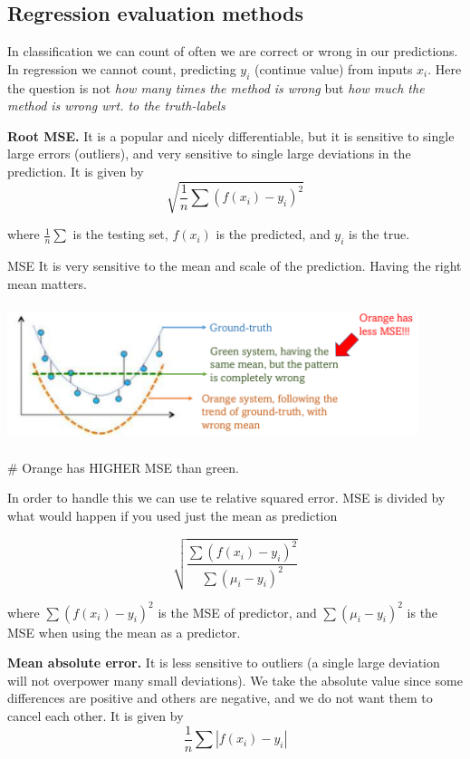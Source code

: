 \documentclass{article}
\begin{document}
\bigskip
\subsection*{Regression evaluation methods}

In classification we can count of often we are correct or wrong in our predictions. In regression we cannot count, predicting \(y_i\) (continue value) from inputs \(x_i\). Here the question is not \emph{how many times the method is wrong} but \emph{how much the method is wrong wrt. to the truth-labels}

\textbf{Root MSE. } It is a popular and nicely differentiable, but it is sensitive to single large errors (outliers), and very sensitive to single large deviations in the prediction. It is given by
\[\sqrt{\dfrac{1}{n} \sum (f(x_i) - y_i)^2}\] 

where \(\frac{1}{n} \sum \) is the testing set, \(f(x_i)\) is the predicted, and \(y_i\) is the true.

MSE It is very sensitive to the mean and scale of the prediction. Having the right mean matters.


\centering\includegraphics[width=12cm, height=4cm]{img/mse.png}	


\raggedright \# Orange has HIGHER MSE than green.

In order to handle this we can use te relative squared error. MSE is divided by what would happen if you used just the mean as prediction

\[\sqrt{\dfrac{\sum (f(x_i) - y_i)^2}{\sum (\mu_i - y_i)^2}}\]

where \(\sum (f(x_i) - y_i)^2\) is the MSE of predictor, and \(\sum (\mu_i - y_i)^2\) is the MSE when using the mean as a predictor. 


\bigskip

\textbf{Mean absolute error. } It is less sensitive to outliers (a single large deviation will not overpower many small deviations). We take the absolute value since some differences are positive and others are negative, and we do not want them to cancel each other. It is given by
\[\dfrac{1}{n} \sum |f(x_i) - y_i|\]
\end{document}
